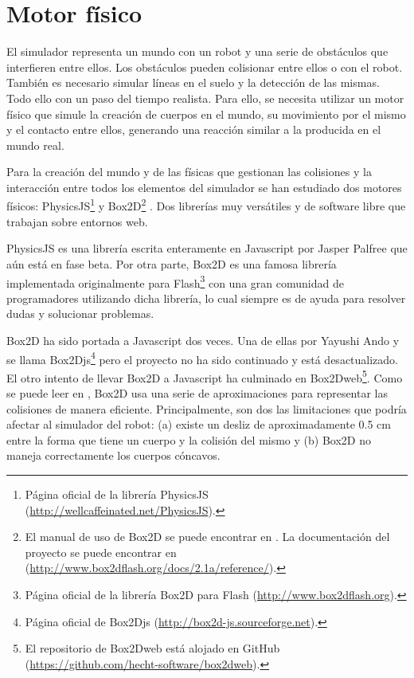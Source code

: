 \section{Motor físico}
\label{sec:motor-fisico}

El simulador representa un mundo con un robot y una serie de obstáculos que interfieren entre ellos. Los obstáculos pueden colisionar entre ellos o con el robot. También es necesario simular líneas en el suelo y la detección de las mismas. Todo ello con un paso del tiempo realista. Para ello, se necesita utilizar un motor físico que simule la creación de cuerpos en el mundo, su movimiento por el mismo y el contacto entre ellos, generando una reacción similar a la producida en el mundo real.

Para la creación del mundo y de las físicas que gestionan las colisiones y la interacción entre todos los elementos del simulador se han estudiado dos motores físicos: PhysicsJS\footnote{Página oficial de la librería PhysicsJS (\url{http://wellcaffeinated.net/PhysicsJS}).} y Box2D\footnote{El manual de uso de Box2D se puede encontrar en \cite{box2d-manual}. La documentación del proyecto se puede encontrar en (\url{http://www.box2dflash.org/docs/2.1a/reference/}).} \cite{box2d}. Dos librerías muy versátiles y de software libre que trabajan sobre entornos web.

PhysicsJS  es una librería escrita enteramente en Javascript por Jasper Palfree que aún está en fase beta. Por otra parte, Box2D es una famosa librería implementada originalmente para Flash\footnote{Página oficial de la librería Box2D para Flash (\url{http://www.box2dflash.org}).} con una gran comunidad de programadores utilizando dicha librería, lo cual siempre es de ayuda para resolver dudas y solucionar problemas. 

Box2D ha sido portada a Javascript dos veces. Una de ellas por Yayushi Ando y se llama Box2Djs\footnote{Página oficial de Box2Djs (\url{http://box2d-js.sourceforge.net}).} pero el proyecto no ha sido continuado y está desactualizado. El otro intento de llevar Box2D a Javascript ha culminado en Box2Dweb\footnote{El repositorio de Box2Dweb está alojado en GitHub (\url{https://github.com/hecht-software/box2dweb}).}. Como se puede leer en \cite[capítulo 13]{box2d-manual}, Box2D usa una serie de aproximaciones para representar las colisiones de manera eficiente. Principalmente, son dos las limitaciones que podría afectar al simulador del robot: (a) existe un desliz de aproximadamente 0.5 cm entre la forma que tiene un cuerpo y la colisión del mismo y (b) Box2D no maneja correctamente los cuerpos cóncavos. 

